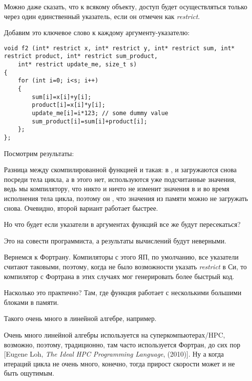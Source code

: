 Можно даже сказать, что к всякому объекту, доступ будет осуществляться только через
один единственный указатель, если он отмечен как \emph{restrict}.

Добавим это ключевое слово к каждому аргументу-указателю:

\begin{lstlisting}[style=customc]
void f2 (int* restrict x, int* restrict y, int* restrict sum, int* restrict product, int* restrict sum_product, 
	int* restrict update_me, size_t s)
{
	for (int i=0; i<s; i++)
	{
		sum[i]=x[i]+y[i];
		product[i]=x[i]*y[i];
		update_me[i]=i*123; // some dummy value
		sum_product[i]=sum[i]+product[i];	
	};
};
\end{lstlisting}

Посмотрим результаты:





Разница между скомпилированной функцией  и  такая:
в ,  и  загружаются снова посреди тела цикла,
а в  этого нет, используются уже подсчитанные значения, 
ведь мы  компилятору, 
что никто и ничто не изменит значения в  
и  во время исполнения тела цикла, 
поэтому он , что значения из памяти можно не загружать снова.
Очевидно, второй вариант работает быстрее.

Но что будет если указатели в аргументах функций все же будут пересекаться?

Это на совести программиста, а результаты вычислений будут неверными.

Вернемся к Фортрану. 
Компиляторы с этого ЯП, по умолчанию, все указатели считают таковыми,
поэтому, когда не было возможности указать \emph{restrict} в Си, 
то компилятор с Фортрана в этих случаях мог генерировать более быстрый код.

Насколько это практично? 
Там, где функция работает с несколькими большими блоками в памяти.

Такого очень много в линейной алгебре, например.

Очень много линейной алгебры используется на суперкомпьютерах/\ac{HPC},
возможно, поэтому, традиционно, там часто используется Фортран, до сих пор
[Eugene Loh, \emph{The Ideal HPC Programming Language}, (2010)].
Ну а когда итераций цикла не очень много, конечно, 
тогда прирост скорости может и не быть ощутимым.

